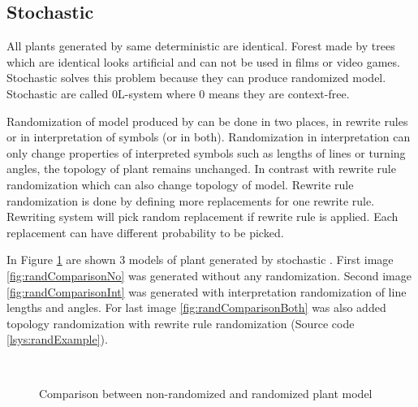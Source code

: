 \subsection{Stochastic \lsystems}

\newcommand{\zerolsystem}{\mbox{0L-system}\xspace}
\newcommand{\zerolsystems}{\mbox{0L-systems}\xspace}

All plants generated by same deterministic \lsystem are identical.
Forest made by trees which are identical looks artificial and can not be used in films or video games.
Stochastic \lsystems solves this problem because they can produce randomized model.
Stochastic \lsystems are called \zerolsystem where 0 means they are context-free.

Randomization of model produced by \lsystem can be done in two places, in rewrite rules or in interpretation of symbols (or in both).
Randomization in interpretation can only change properties of interpreted symbols such as lengths of lines or turning angles, the topology of plant remains unchanged.
In contrast with rewrite rule randomization which can also change topology of model.
Rewrite rule randomization is done by defining more replacements for one rewrite rule.
Rewriting system will pick random replacement if rewrite rule is applied.
Each replacement can have different probability to be picked.

In Figure \ref{fig:randComparison} are shown 3 models of plant generated by stochastic \lsystems.
First image \ref{fig:randComparisonNo} was generated without any randomization.
Second image \ref{fig:randComparisonInt} was generated with interpretation randomization of line lengths and angles.
For last image \ref{fig:randComparisonBoth} was also added topology randomization with rewrite rule randomization (Source code \ref{lsys:randExample}).

\begin{figure}[h]
	\centering
	 ~
	 ~
	\caption{Comparison between non-randomized and randomized plant model}
	\label{fig:randComparison}
\end{figure}

